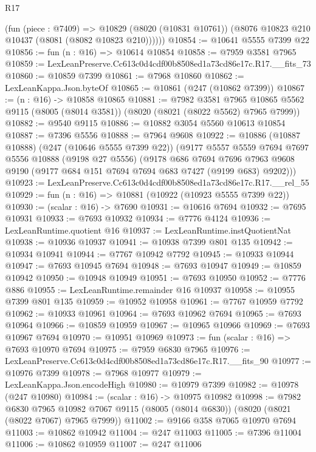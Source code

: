 \begin{lexlean}{R17}
\begin{coremodule}
        (fun (piece : @7409) =>
        @10829 (@8020 (@10831 @10761)) (@8076 @10823 @210 @10437 (@8081 (@8082 @10823 @210))))))
@10854 := @10641 @5555 @7399 @22
@10856 := fun (n : @16) => @10614 @10854
@10858 := @7959 @3581 @7965
@10859 := LexLeanPreserve.Cc613c0d4cdf00b8508ed1a73cd86e17c.R17.__fits_73
@10860 := @10859 @7399
@10861 := @7968 @10860
@10862 := LexLeanKappa.Json.byteOf
@10865 := @10861 (@247 (@10862 @7399))
@10867 := (n : @16) -> @10858 @10865
@10881 := @7982
    @3581
    @7965
    @10865
    @5562
    @9115
    (@8005 (@8014 @3581))
    (@8020 (@8021 (@8022 @5562) @7965 @7999))
@10882 := @9540 @9115
@10886 := @10882 @3054 @5560 @10613 @10854
@10887 := @7396 @5556
@10888 := @7964 @9608
@10922 := @10886
    (@10887 @10888)
    (@247 (@10646 @5555 @7399 @22))
    (@9177
      @5557
      @5559
      @7694
      @7697
      @5556
      @10888
      (@9198 @27 @5556)
      (@9178
        @686
        @7694
        @7696
        @7963
        @9608
        @9190
        (@9177 @684 @151 @7694 @7694 @683 @7427 (@9199 @683) @9202)))
@10923 := LexLeanPreserve.Cc613c0d4cdf00b8508ed1a73cd86e17c.R17.__rel_55
@10929 := fun (n : @16) => @10881 (@10922 (@10923 @5555 @7399 @22))
@10930 := (scalar : @16) -> @7690
@10931 := @10616 @7694
@10932 := @7695 @10931
@10933 := @7693 @10932
@10934 := @7776 @4124
@10936 := LexLeanRuntime.quotient @16
@10937 := LexLeanRuntime.instQuotientNat
@10938 := @10936 @10937
@10941 := @10938 @7399 @801 @135
@10942 := @10934 @10941
@10944 := @7767 @10942 @7792
@10945 := @10933 @10944
@10947 := @7693 @10945 @7694
@10948 := @7693 @10947
@10949 := @10859 @10942
@10950 := @10948 @10949
@10951 := @7693 @10950
@10952 := @7776 @886
@10955 := LexLeanRuntime.remainder @16 @10937
@10958 := @10955 @7399 @801 @135
@10959 := @10952 @10958
@10961 := @7767 @10959 @7792
@10962 := @10933 @10961
@10964 := @7693 @10962 @7694
@10965 := @7693 @10964
@10966 := @10859 @10959
@10967 := @10965 @10966
@10969 := @7693 @10967 @7694
@10970 := @10951 @10969
@10973 := fun (scalar : @16) => @7693 @10970 @7694
@10975 := @7959 @6830 @7965
@10976 := LexLeanPreserve.Cc613c0d4cdf00b8508ed1a73cd86e17c.R17.__fits_90
@10977 := @10976 @7399
@10978 := @7968 @10977
@10979 := LexLeanKappa.Json.encodeHigh
@10980 := @10979 @7399
@10982 := @10978 (@247 @10980)
@10984 := (scalar : @16) -> @10975 @10982
@10998 := @7982
    @6830
    @7965
    @10982
    @7067
    @9115
    (@8005 (@8014 @6830))
    (@8020 (@8021 (@8022 @7067) @7965 @7999))
@11002 := @9166 @358 @7065 @10970 @7694
@11003 := @10862 @10942
@11004 := @247 @11003
@11005 := @7396 @11004
@11006 := @10862 @10959
@11007 := @247 @11006

\end{coremodule}
\end{lexlean}

